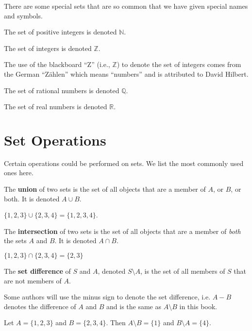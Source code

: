 There are some special sets that are so common that we have given special names and symbols.
\begin{definition}
    The set of positive integers is denoted $\mathbb{N}$.
\end{definition}
\begin{definition}
    The set of integers  is denoted $\mathbb{Z}$.
\end{definition}
\begin{remark}
    The use of the blackboard ``Z'' (i.e., $\mathbb{Z}$) to denote the set of integers comes from the German ``Z\"{a}hlen'' which means ``numbers'' and is attributed to David Hilbert.
\end{remark}
\begin{definition}
    The set of rational numbers is denoted $\mathbb{Q}$.
\end{definition}
\begin{definition}
    The set of real numbers is denoted $\mathbb{R}$.
\end{definition}

\newpage

\section{Set Operations}
Certain operations could be performed on sets. We list the most commonly used ones here.

\begin{definition}
    The \textbf{union} of two sets is the set of all objects that are a member of $A$, or $B$, or both. It is denoted $A \cup B$.
\end{definition}
\begin{example}
    $\{1, 2, 3\} \cup \{2, 3, 4\} = \{1, 2, 3, 4\}$.
\end{example}

\begin{definition}
    The \textbf{intersection} of two sets is the set of all objects that are a member of \textit{both} the sets $A$ and $B$. It is denoted $A \cap B$.
\end{definition}
\begin{example}
    $\{1, 2, 3\} \cap \{2, 3, 4\} = \{2, 3\}$
\end{example}

\begin{definition}
    The \textbf{set difference} of $S$ and $A$, denoted $S \setminus A$, is the set of all members of $S$ that are not members of $A$.
\end{definition}
\begin{remark}
    Some authors will use the minus sign to denote the set difference, i.e. $A - B$ denotes the difference of $A$ and $B$ and is the same as $A \setminus B$ in this book.
\end{remark}
\begin{example}
    Let $A = \{1, 2, 3\}$ and $B = \{2, 3, 4\}$. Then $A \setminus B = \{1\}$ and $B \setminus A = \{4\}$.
\end{example}


